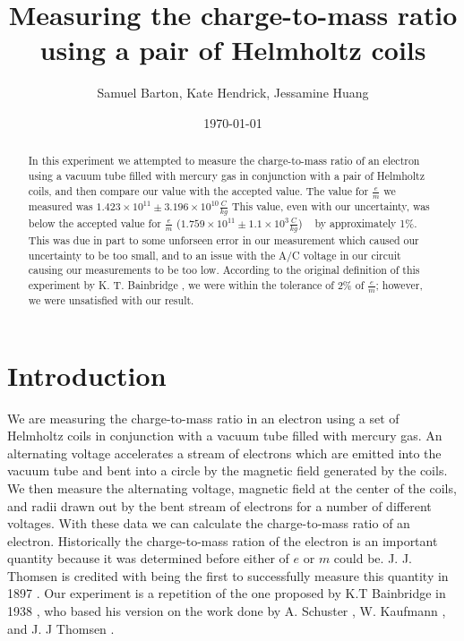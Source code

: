 \documentclass[aps,twocolumn,secnumarabic,amsmath,amssymb,nofootinbib]{revtex4-1}
\begin{document}
\title{Measuring the charge-to-mass ratio using a pair of Helmholtz coils}
\author{Samuel Barton, Kate Hendrick, Jessamine Huang}
\date{\today}

\begin{abstract}
In this experiment we attempted to measure the charge-to-mass ratio of an electron using a vacuum tube filled with mercury gas in conjunction with a pair of Helmholtz coils, and then compare our value with the accepted value. The value for $\frac{e}{m}$ we measured was $1.423\times10^{11} \pm 3.196\times10^{10} \frac{C}{kg}$ This value, even with our uncertainty, was below the accepted value for $\frac{e}{m}$ ($1.759\times10^{11} \pm 1.1\times10^3 \frac{C}{kg}$) ~\cite{value} by approximately 1\%. This was due in part to some unforseen error in our measurement which caused our uncertainty to be too small, and to an issue with the A/C voltage in our circuit causing our measurements to be too low. According to the original definition of this experiment by K. T. Bainbridge \cite{origin}, we were within the tolerance of 2\% of $\frac{e}{m}$; however, we were unsatisfied with our result.
\linebreak
\end{abstract}

\maketitle

%
%
\section{Introduction}

We are measuring the charge-to-mass ratio in an electron using a set of Helmholtz coils in conjunction with a vacuum tube filled with mercury gas. An alternating voltage accelerates a stream of electrons which are emitted into the vacuum tube and bent into a circle by the magnetic field generated by the coils. We then measure the alternating voltage, magnetic field at the center of the coils, and radii drawn out by the bent stream of electrons for a number of different voltages. With these data we can calculate the charge-to-mass ratio of an electron. Historically the charge-to-mass ration of the electron is an important quantity because it was determined before either of $e$ or $m$ could be. J. J. Thomsen is credited with being the first to successfully measure this quantity in 1897 \cite{first_measurement}. Our experiment is a repetition of the one proposed by K.T Bainbridge in 1938 \cite{origin}, who based his version on the work done by A. Schuster \cite{schuster}, W. Kaufmann \cite{kaufmann}, and J. J Thomsen \cite{thomsen}.
\end{document}

